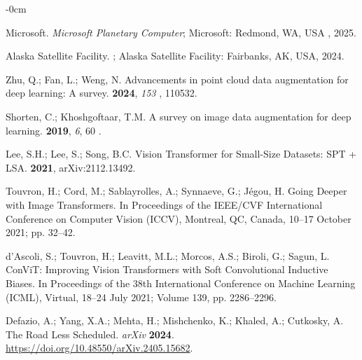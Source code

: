 \documentclass[remotesensing,article,accept,pdftex,moreauthors]{Definitions/mdpi}
\renewcommand{\hl}[1]{#1}
\begin{document}
\begin{adjustwidth}{-\extralength}{0cm}
\begin{thebibliography}{999}
Microsoft.
\newblock \emph{Microsoft {Planetary} {Computer}}; \hl{Microsoft: Redmond, WA, USA}%
, 2025.

{Alaska Satellite Facility}.
; \hl{Alaska Satellite Facility: Fairbanks, AK, USA}, 2024.

Zhu, Q.; Fan, L.; Weng, N.
\newblock Advancements in point cloud data augmentation for deep learning: A
  survey.
 {\bf 2024}, \emph{\hl{153}%
}, 110532.

Shorten, C.; Khoshgoftaar, T.M.
\newblock A survey on image data augmentation for deep learning.
 {\bf 2019}, {\em 6}, \hl{60}%
.

Lee, S.H.; Lee, S.; Song, B.C.
\newblock Vision Transformer for Small-Size Datasets: {SPT + LSA}.
 {\bf 2021}, arXiv:2112.13492.

Touvron, H.; Cord, M.; Sablayrolles, A.; Synnaeve, G.; J{\'e}gou, H.
\newblock Going Deeper with Image Transformers.
\newblock In Proceedings of the IEEE/CVF International
  Conference on Computer Vision (ICCV), \hl{Montreal, QC, Canada, 10--17 October} 2021; pp. 32--42.

d'Ascoli, S.; Touvron, H.; Leavitt, M.L.; Morcos, A.S.; Biroli, G.; Sagun, L.
\newblock ConViT: Improving Vision Transformers with Soft Convolutional
  Inductive Biases.
\newblock In Proceedings of the 38th International
  Conference on Machine Learning (ICML), \hl{Virtual, 18--24 July} 2021; Volume 139, pp. 2286--2296.

Defazio, A.; Yang, X.A.; Mehta, H.; Mishchenko, K.; Khaled, A.; Cutkosky, A.
\newblock The Road Less Scheduled. \emph{\hl{arXiv} %
} \textbf{2024}.
  {\url{https://doi.org/10.48550/arXiv.2405.15682}}.


\end{thebibliography}
\end{adjustwidth}
\end{document}
